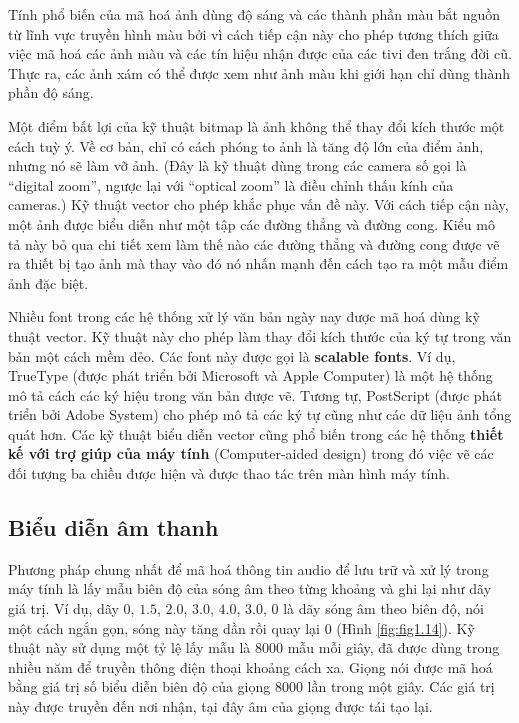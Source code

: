 Tính phổ biến của mã hoá ảnh dùng độ sáng và các thành phần màu bắt nguồn từ lĩnh vực
truyền hình màu bởi vì cách tiếp cận này cho phép tương thích giữa việc mã hoá các ảnh màu
và các tín hiệu nhận được của các tivi đen trắng đời cũ. Thực ra, các ảnh xám có thể được
xem như ảnh màu khi giới hạn chỉ dùng thành phần độ sáng.

Một điểm bất lợi của kỹ thuật bitmap là ảnh không thể thay đổi kích thước một cách tuỳ
ý. Về cơ bản, chỉ có cách phóng to ảnh là tăng độ lớn của điểm ảnh, nhưng nó sẽ làm vỡ
ảnh. (Đây là kỹ thuật dùng trong các camera số gọi là ``digital zoom'', ngược lại với
``optical zoom'' là điều chỉnh thấu kính của cameras.) Kỹ thuật vector cho phép khắc phục
vấn đề này. Với cách tiếp cận này, một ảnh được biểu diễn như một tập các đường thẳng và
đường cong. Kiểu mô tả này bỏ qua chi tiết xem làm thế nào các đường thẳng và đường cong
được vẽ ra thiết bị tạo ảnh mà thay vào đó nó nhấn mạnh đến cách tạo ra một mẫu điểm ảnh
đặc biệt.

Nhiều font trong các hệ thống xử lý văn bản ngày nay được mã hoá dùng kỹ thuật vector. Kỹ
thuật này cho phép làm thay đổi kích thước của ký tự trong văn bản một cách mềm dẻo. Các
font này được gọi là \textbf{scalable fonts}. Ví dụ, TrueType (được phát triển bởi
Microsoft và Apple Computer) là một hệ thống mô tả cách các ký hiệu trong văn bản được
vẽ. Tương tự, PostScript (được phát triển bởi Adobe System) cho phép mô tả các ký tự cũng
như các dữ liệu ảnh tổng quát hơn. Các kỹ thuật biểu diễn vector cũng phổ biến trong các
hệ thống \textbf{thiết kế với trợ giúp của máy tính} (Computer-aided design) trong đó việc
vẽ các đối tượng ba chiều được hiện và được thao tác trên màn hình máy tính.

\subsection*{Biểu diễn âm thanh}

Phương pháp chung nhất để mã hoá thông tin audio để lưu trữ và xử lý trong máy tính là lấy
mẫu biên độ của sóng âm theo từng khoảng và ghi lại như dãy giá trị. Ví dụ, dãy $0$,
$1.5$, $2.0$, $3.0$, $4.0$, $3.0$, $0$ là dãy sóng âm theo biên độ, nói một cách ngắn gọn,
sóng này tăng dần rồi quay lại $0$ (Hình \ref{fig:fig1.14}). Kỹ thuật này sử dụng một tỷ lệ lấy mẫu
là $8000$ mẫu mỗi giây, đã được dùng trong nhiều năm để truyền thông điện thoại khoảng
cách xa. Giọng nói được mã hoá bằng giá trị số biểu diễn biên độ của giọng $8000$ lần
trong một giây. Các giá trị này được truyền đến nơi nhận, tại đây âm của giọng được tái
tạo lại.


